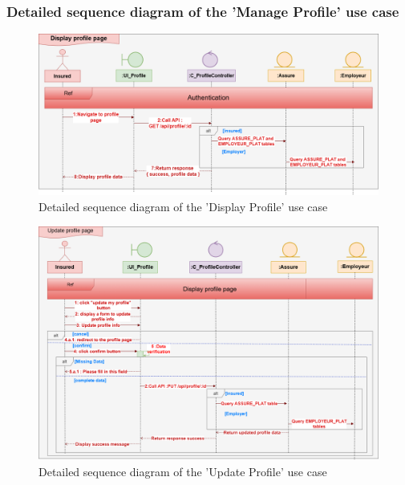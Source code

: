 \subsubsection{Detailed sequence diagram of the 'Manage Profile' use case}
\begin{figure}[h!]
    \centering
    \includegraphics[width=1\textwidth]{figures/det display profile.png}
    \caption{Detailed sequence diagram of the 'Display Profile' use case}
    \label{fig:image4}
\end{figure}
\begin{figure}[h!]
    \centering
    \includegraphics[width=1\textwidth]{figures/det update profile.png}
    \caption{Detailed sequence diagram of the 'Update Profile' use case}
    \label{fig:image4}
\end{figure}
\clearpage
